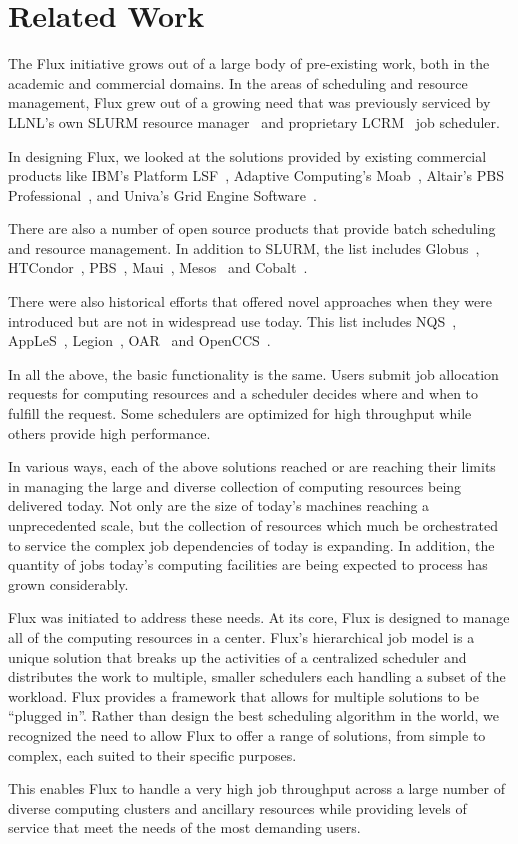 \section{Related Work}

The Flux initiative grows out of a large body of pre-existing work,
both in the academic and commercial domains.  In the areas of
scheduling and resource management, Flux grew out of a growing need
that was previously serviced by LLNL's own SLURM resource
manager~\cite{Jette02slurm} and proprietary LCRM~\cite{LCRM} job
scheduler.

In designing Flux, we looked at the solutions provided by existing
commercial products like IBM's Platform LSF~\cite{LSF}, Adaptive
Computing's Moab~\cite{Moab}, Altair's PBS Professional~\cite{PSBPro},
and Univa's Grid Engine Software~\cite{UnivaGE}.

There are also a number of open source products that provide batch
scheduling and resource management.  In addition to SLURM, the list
includes Globus~\cite{GlobusToolkit},
HTCondor~\cite{Litzkow88,Raman98}, PBS~\cite{PBS},
Maui~\cite{Jackson01corealgorithms}, Mesos~\cite{Mesos} and
Cobalt~\cite{Cobalt}.

There were also historical efforts that offered novel approaches when
they were introduced but are not in widespread use today.  This list
includes NQS~\cite{NQS}, AppLeS~\cite{AppLeS},
Legion~\cite{LegionRM,LegionGrid}, OAR~\cite{Oar} and
OpenCCS~\cite{Keller98ccsresource}.

In all the above, the basic functionality is the same.  Users submit
job allocation requests for computing resources and a scheduler
decides where and when to fulfill the request.  Some schedulers are
optimized for high throughput while others provide high performance.

In various ways, each of the above solutions reached or are reaching
their limits in managing the large and diverse collection of computing
resources being delivered today.  Not only are the size of today's
machines reaching a unprecedented scale, but the collection of
resources which much be orchestrated to service the complex job
dependencies of today is expanding.  In addition, the quantity of jobs
today's computing facilities are being expected to process has grown
considerably.

Flux was initiated to address these needs.  At its core, Flux is
designed to manage all of the computing resources in a center.  Flux's
hierarchical job model is a unique solution that breaks up the
activities of a centralized scheduler and distributes the work to
multiple, smaller schedulers each handling a subset of the workload.
Flux provides a framework that allows for multiple solutions to be
``plugged in''.  Rather than design the best scheduling algorithm in
the world, we recognized the need to allow Flux to offer a range of
solutions, from simple to complex, each suited to their specific
purposes.

This enables Flux to handle a very high job throughput across a large
number of diverse computing clusters and ancillary resources while
providing levels of service that meet the needs of the most demanding
users.
